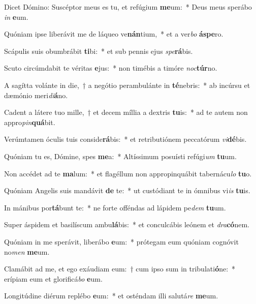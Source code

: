 \item Dicet Dómino: Suscéptor meus es tu, et refúgium \textbf{me}um:~* Deus meus sperábo \textit{in} \textbf{e}um.
\item Quóniam ipse liberávit me de láqueo ve\textbf{nán}tium,~* et a ver\textit{bo} \textbf{ás}\textbf{pe}ro.
\item Scápulis suis obumbrábit \textbf{ti}bi:~* et sub pennis ejus \textit{spe}\textbf{rá}bis.
\item Scuto circúmdabit te véritas \textbf{e}jus:~* non timébis a timóre \textit{noc}\textbf{túr}no.
\item A sagítta volánte in die,~† a negótio perambulánte in \textbf{té}nebris:~* ab incúrsu et dæmónio meri\textit{di}\textbf{á}no.
\item Cadent a látere tuo mille,~† et decem míllia a dextris \textbf{tu}is:~* ad te autem non appro\textit{pin}\textbf{quá}bit.
\item Verúmtamen óculis tuis conside\textbf{rá}bis:~* et retributiónem peccatórum \textit{vi}\textbf{dé}bis.
\item Quóniam tu es, Dómine, spes \textbf{me}a:~* Altíssimum posuísti refúgi\textit{um} \textbf{tu}um.
\item Non accédet ad te \textbf{ma}lum:~* et flagéllum non appropinquábit tabernácu\textit{lo} \textbf{tu}o.
\item Quóniam Angelis suis mandávit \textbf{de} te:~* ut custódiant te in ómnibus vi\textit{is} \textbf{tu}is.
\item In mánibus por\textbf{tá}bunt te:~* ne forte offéndas ad lápidem pe\textit{dem} \textbf{tu}um.
\item Super áspidem et basilíscum ambu\textbf{lá}bis:~* et conculcábis leónem et \textit{dra}\textbf{có}nem.
\item Quóniam in me sperávit, liberábo \textbf{e}um:~* prótegam eum quóniam cognóvit no\textit{men} \textbf{me}um.
\item Clamábit ad me, et ego exáudiam eum:~† cum ipso sum in tribulati\textbf{ó}ne:~* erípiam eum et glorificá\textit{bo} \textbf{e}um.
\item Longitúdine diérum replébo \textbf{e}um:~* et osténdam illi salutá\textit{re} \textbf{me}um.
